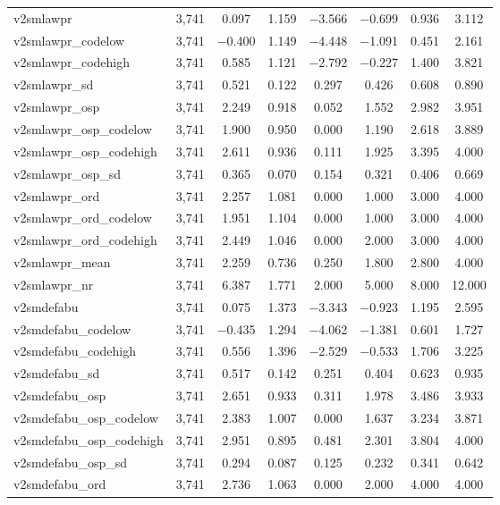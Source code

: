 \begin{table}[!htbp]
\begin{tabular}{@{\extracolsep{5pt}}lccccccc}
v2smlawpr & 3,741 & 0.097 & 1.159 & $-$3.566 & $-$0.699 & 0.936 & 3.112 \\ 
v2smlawpr\_codelow & 3,741 & $-$0.400 & 1.149 & $-$4.448 & $-$1.091 & 0.451 & 2.161 \\ 
v2smlawpr\_codehigh & 3,741 & 0.585 & 1.121 & $-$2.792 & $-$0.227 & 1.400 & 3.821 \\ 
v2smlawpr\_sd & 3,741 & 0.521 & 0.122 & 0.297 & 0.426 & 0.608 & 0.890 \\ 
v2smlawpr\_osp & 3,741 & 2.249 & 0.918 & 0.052 & 1.552 & 2.982 & 3.951 \\ 
v2smlawpr\_osp\_codelow & 3,741 & 1.900 & 0.950 & 0.000 & 1.190 & 2.618 & 3.889 \\ 
v2smlawpr\_osp\_codehigh & 3,741 & 2.611 & 0.936 & 0.111 & 1.925 & 3.395 & 4.000 \\ 
v2smlawpr\_osp\_sd & 3,741 & 0.365 & 0.070 & 0.154 & 0.321 & 0.406 & 0.669 \\ 
v2smlawpr\_ord & 3,741 & 2.257 & 1.081 & 0.000 & 1.000 & 3.000 & 4.000 \\ 
v2smlawpr\_ord\_codelow & 3,741 & 1.951 & 1.104 & 0.000 & 1.000 & 3.000 & 4.000 \\ 
v2smlawpr\_ord\_codehigh & 3,741 & 2.449 & 1.046 & 0.000 & 2.000 & 3.000 & 4.000 \\ 
v2smlawpr\_mean & 3,741 & 2.259 & 0.736 & 0.250 & 1.800 & 2.800 & 4.000 \\ 
v2smlawpr\_nr & 3,741 & 6.387 & 1.771 & 2.000 & 5.000 & 8.000 & 12.000 \\ 
v2smdefabu & 3,741 & 0.075 & 1.373 & $-$3.343 & $-$0.923 & 1.195 & 2.595 \\ 
v2smdefabu\_codelow & 3,741 & $-$0.435 & 1.294 & $-$4.062 & $-$1.381 & 0.601 & 1.727 \\ 
v2smdefabu\_codehigh & 3,741 & 0.556 & 1.396 & $-$2.529 & $-$0.533 & 1.706 & 3.225 \\ 
v2smdefabu\_sd & 3,741 & 0.517 & 0.142 & 0.251 & 0.404 & 0.623 & 0.935 \\ 
v2smdefabu\_osp & 3,741 & 2.651 & 0.933 & 0.311 & 1.978 & 3.486 & 3.933 \\ 
v2smdefabu\_osp\_codelow & 3,741 & 2.383 & 1.007 & 0.000 & 1.637 & 3.234 & 3.871 \\ 
v2smdefabu\_osp\_codehigh & 3,741 & 2.951 & 0.895 & 0.481 & 2.301 & 3.804 & 4.000 \\ 
v2smdefabu\_osp\_sd & 3,741 & 0.294 & 0.087 & 0.125 & 0.232 & 0.341 & 0.642 \\ 
v2smdefabu\_ord & 3,741 & 2.736 & 1.063 & 0.000 & 2.000 & 4.000 & 4.000 \\ 

\end{tabular}
\end{table}
